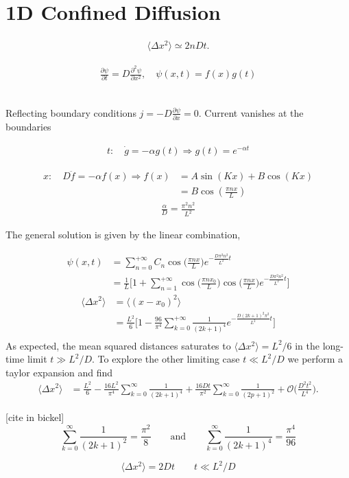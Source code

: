 \chapter{1D Confined Diffusion}

\begin{align*}
  \langle \Delta x^2 \rangle \simeq 2n Dt.
\end{align*}


\begin{align*}
  \frac{\partial \psi}{\partial t} =  D \frac{\partial^2 \psi}{\partial x^2}, \quad
\psi(x,t) =
f(x)g(t)
\end{align*}

\begin{align*}
\end{align*}

Reflecting boundary conditions $j = - D \frac{\partial \psi}{\partial x} = 0$. Current
vanishes at the boundaries

\begin{align*}
t:\quad \dot{g} = - \alpha g(t) \Rightarrow g(t) = e^{-\alpha t}
\end{align*}

\begin{align*}
  x:\quad D \ddot{f} = - \alpha f(x) \Rightarrow f(x) &= A \sin(K x) + B \cos(Kx)\\
  &= B \cos(\frac{\pi n x}{L})
\end{align*}
\begin{align*}
  \frac{\alpha}{D} = \frac{\pi^2 n^2}{L^2}
\end{align*}

The general solution is given by the linear combination,

\begin{align*}
  \psi(x,t) &= \sum_{n=0}^{+\infty} C_n \cos\Big(\frac{\pi n x}{L}\Big) e^{- \frac{D\pi^2
  n^2}{L^2}t}\\
            &=\frac{1}{L} \Bigg[ 1 + \sum_{n=1}^{+\infty} \cos\Big(\frac{\pi n
  x_0}{L}\Big) \cos\Big(\frac{\pi n x}{L}\Big) e^{- \frac{D\pi^2  n^2}{L^2}t}\Bigg]
\end{align*}
\begin{align*}
  \langle \Delta x^2 \rangle &= \langle(x-x_0)^2\rangle\\&= \frac{L^2}{6}\Bigg[1 -
  \frac{96}{\pi^4}
  \sum_{k=0}^{+\infty} \frac{1}{(2k+1)^4} e^{- \frac{D(2k+1)^2 \pi^2}{L^2}t}\Bigg]\\
\end{align*}
As expected, the mean squared distances saturates to $\langle \Delta x^2 \rangle = L^2/6$
in the long-time limit $t \gg L^2 / D.$ To explore the other limiting case $t \ll L^2/D
$ we perform a taylor expansion and find
\begin{align*}
  \langle \Delta x^2 \rangle &= \frac{L^2}{6} - \frac{16 L^2}{\pi^4} \sum_{k=0}^{\infty}
  \frac{1}{(2k+1)^4} + \frac{16 D t}{\pi^2} \sum_{k=0}^{\infty} \frac{1}{(2p+1)^2} +
  \mathcal{O}\bigg(\frac{D^2 t^2}{L^4}\bigg).
\end{align*}

[cite in bickel]
\begin{equation*}
  \sum_{k=0}^{\infty} \frac{1}{(2k+1)^2} = \frac{\pi^2}{8} \qquad \text{and} \qquad
  \sum_{k=0}^{\infty} \frac{1}{(2k+1)^4} = \frac{\pi^4}{96}
\end{equation*}

\begin{equation*}
\langle \Delta x^2 \rangle = 2Dt \qquad t \ll L^2/D
\end{equation*}
